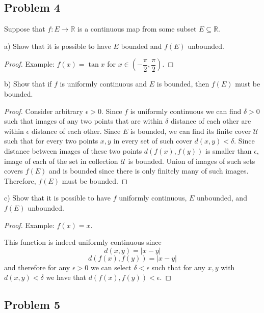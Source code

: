 \documentclass{article}
\begin{document}
\subsection*{Problem 4}

\begin{tcolorbox}
Suppose that $f : E \to \mathbb{R}$ is a continuous map from some subset $E \subseteq \mathbb{R}$.

a) Show that it is possible to have $E$ bounded and $f(E)$ unbounded.
\end{tcolorbox}
\begin{proof}
Example: $f(x) = \tan x$ for $x \in \left( -\dfrac{\pi}{2}, \dfrac{\pi}{2} \right)$.
\end{proof}

\begin{tcolorbox}
b) Show that if $f$ is uniformly continuous and $E$ is bounded, then $f(E)$ must be bounded.
\end{tcolorbox}
\begin{proof}
Consider arbitrary $\epsilon>0$. Since $f$ is uniformly continuous we can find $\delta>0$ such that images of any two points that are within $\delta$ distance of each other are within $\epsilon$ distance of each other.
Since $E$ is bounded, we can find its finite cover $\mathcal{U}$ such that for every two points $x,y$ in every set of such cover $d(x,y) < \delta$. Since distance between images of these two points $d(f(x), f(y))$ is smaller than $\epsilon$, image of each of the set in collection $\mathcal{U}$ is bounded. Union of images of such sets covers $f(E)$ and is bounded since there is only finitely many of such images. Therefore, $f(E)$ must be bounded.
\end{proof}

\begin{tcolorbox}
c) Show that it is possible to have $f$ uniformly continuous, $E$ unbounded, and $f(E)$ unbounded.
\end{tcolorbox}
\begin{proof}
Example: $f(x) = x$.

This function is indeed uniformly continuous since
$$ d(x,y) = |x-y| $$
$$ d(f(x),f(y)) = |x-y| $$
and therefore for any $\epsilon > 0$ we can select $\delta < \epsilon$ such that for any $x, y$ with $d(x,y)<\delta$ we have that $d(f(x),f(y)) < \epsilon$.


\end{proof}

\subsection*{Problem 5}
\end{document}
